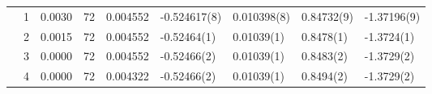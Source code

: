 \begin{tabular}{llrrrllll}
         & 1 &    0.0030 &     72 &  0.004552 &   -0.524617(8) &     0.010398(8) &     0.84732(9) &    -1.37196(9) \\
         & 2 &    0.0015 &     72 &  0.004552 &    -0.52464(1) &      0.01039(1) &      0.8478(1) &     -1.3724(1) \\
         & 3 &    0.0000 &     72 &  0.004552 &    -0.52466(2) &      0.01039(1) &      0.8483(2) &     -1.3729(2) \\
         & 4 &    0.0000 &     72 &  0.004322 &    -0.52466(2) &      0.01039(1) &      0.8494(2) &     -1.3729(2) \\
\bottomrule
\end{tabular}
